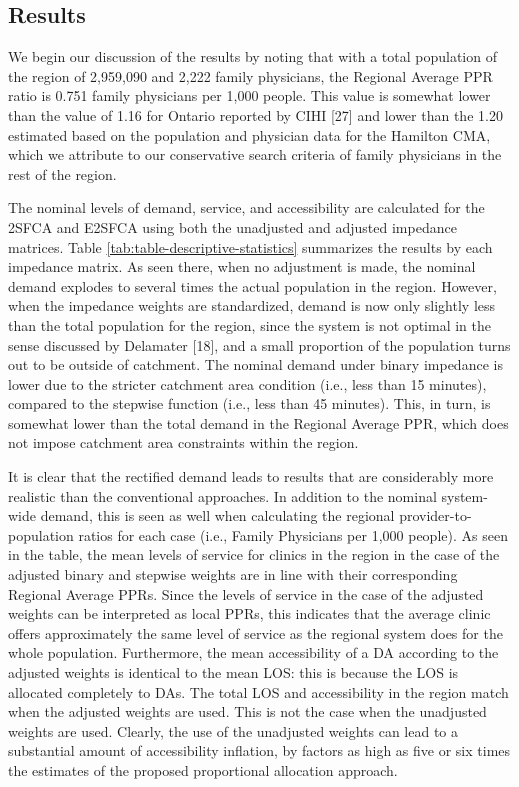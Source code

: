 \documentclass[10pt,letterpaper]{article}
\begin{document}
\subsection{Results}\label{results}

We begin our discussion of the results by noting that with a total
population of the region of 2,959,090 and 2,222 family physicians, the
Regional Average PPR ratio is 0.751 family physicians per 1,000 people.
This value is somewhat lower than the value of 1.16 for Ontario reported
by CIHI {[}27{]} and lower than the 1.20 estimated based on the
population and physician data for the Hamilton CMA, which we attribute
to our conservative search criteria of family physicians in the rest of
the region.

The nominal levels of demand, service, and accessibility are calculated
for the 2SFCA and E2SFCA using both the unadjusted and adjusted
impedance matrices. Table \ref{tab:table-descriptive-statistics}
summarizes the results by each impedance matrix. As seen there, when no
adjustment is made, the nominal demand explodes to several times the
actual population in the region. However, when the impedance weights are
standardized, demand is now only slightly less than the total population
for the region, since the system is not optimal in the sense discussed
by Delamater {[}18{]}, and a small proportion of the population turns
out to be outside of catchment. The nominal demand under binary
impedance is lower due to the stricter catchment area condition (i.e.,
less than 15 minutes), compared to the stepwise function (i.e., less
than 45 minutes). This, in turn, is somewhat lower than the total demand
in the Regional Average PPR, which does not impose catchment area
constraints within the region.

It is clear that the rectified demand leads to results that are
considerably more realistic than the conventional approaches. In
addition to the nominal system-wide demand, this is seen as well when
calculating the regional provider-to-population ratios for each case
(i.e., Family Physicians per 1,000 people). As seen in the table, the
mean levels of service for clinics in the region in the case of the
adjusted binary and stepwise weights are in line with their
corresponding Regional Average PPRs. Since the levels of service in the
case of the adjusted weights can be interpreted as local PPRs, this
indicates that the average clinic offers approximately the same level of
service as the regional system does for the whole population.
Furthermore, the mean accessibility of a DA according to the adjusted
weights is identical to the mean LOS: this is because the LOS is
allocated completely to DAs. The total LOS and accessibility in the
region match when the adjusted weights are used. This is not the case
when the unadjusted weights are used. Clearly, the use of the unadjusted
weights can lead to a substantial amount of accessibility inflation, by
factors as high as five or six times the estimates of the proposed
proportional allocation approach.
\end{document}
